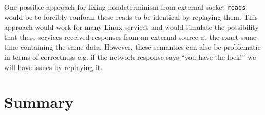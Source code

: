 \begin{itemize}
One possible approach for fixing nondeterminism from external
socket \texttt{reads} would be to forcibly
conform these reads to be identical by replaying
them. This approach would work for many 
Linux services and would simulate the possibility
that these services received responses from
an external source at the exact same time containing
the same data. However, these semantics can
also be problematic in terms of correctness e.g. if the network 
response says ``you have the lock!'' we will have issues
by replaying it.

\end{itemize}
\section {Summary}
